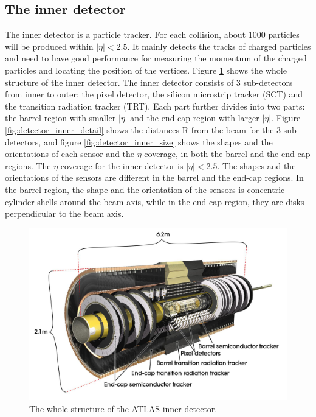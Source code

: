\subsection{The inner detector}
The inner detector is a particle tracker.
For each collision, about 1000 particles will be produced within $|\eta| < 2.5$.
It mainly detects the tracks of charged particles and need to have good performance for measuring the momentum of the charged particles and locating the position of the vertices.
Figure \ref{fig:detector_inner_whole} shows the whole structure of the inner detector.
The inner detector consists of 3 sub-detectors from inner to outer: the pixel detector, the silicon microstrip tracker (SCT) and the transition radiation tracker (TRT).
Each part further divides into two parts: the barrel region with smaller $|\eta|$ and the end-cap region with larger $|\eta|$.
Figure \ref{fig:detector_inner_detail} shows the distances R from the beam for the 3 sub-detectors, and figure \ref{fig:detector_inner_size} shows the shapes and the orientations of each sensor and the $\eta$ coverage, in both the barrel and the end-cap regions.
The $\eta$ coverage for the inner detector is $|\eta| < 2.5$.
The shapes and the orientations of the sensors are different in the barrel and the end-cap regions.
In the barrel region, the shape and the orientation of the sensors is concentric cylinder shells around the beam axis, while in the end-cap region, they are disks perpendicular to the beam axis.
\begin{figure}
\centering
\includegraphics[width=\textwidth]{data/photo/detector/inner_whole.jpg}
\caption{The whole structure of the ATLAS inner detector. \cite{inner_photo}}
\label{fig:detector_inner_whole}
\end{figure}
